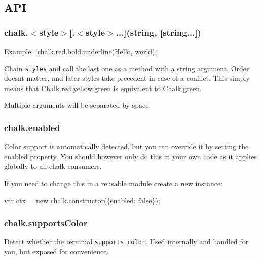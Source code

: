 

\subsection*{A\+P\+I}

\subsubsection*{chalk.{\ttfamily $<$style$>$\mbox{[}.$<$style$>$...\mbox{]}(string, \mbox{[}string...\mbox{]})}}

Example\+: `chalk.red.\+bold.\+underline(\textquotesingle{}Hello\textquotesingle{}, \textquotesingle{}world\textquotesingle{});`

Chain \href{#styles}{\tt styles} and call the last one as a method with a string argument. Order doesn\textquotesingle{}t matter, and later styles take precedent in case of a conflict. This simply means that {\ttfamily Chalk.\+red.\+yellow.\+green} is equivalent to {\ttfamily Chalk.\+green}.

Multiple arguments will be separated by space.

\subsubsection*{chalk.\+enabled}

Color support is automatically detected, but you can override it by setting the {\ttfamily enabled} property. You should however only do this in your own code as it applies globally to all chalk consumers.

If you need to change this in a reusable module create a new instance\+:


\begin{DoxyCode}
var ctx = \textcolor{keyword}{new} chalk.constructor(\{enabled: \textcolor{keyword}{false}\});
\end{DoxyCode}


\subsubsection*{chalk.\+supports\+Color}

Detect whether the terminal \href{https://github.com/sindresorhus/supports-color}{\tt supports color}. Used internally and handled for you, but exposed for convenience.

